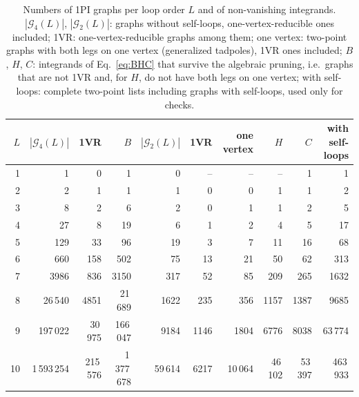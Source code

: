 \begin{table}
\caption{\label{tab:graphcounts}%
Numbers of 1PI graphs per loop order $L$ and of non-vanishing integrands. $|\mathcal G_4(L)|$, $|\mathcal G_2(L)|$:
graphs without self-loops, one-vertex-reducible ones included; 1VR: one-vertex-reducible graphs among them; one vertex:
two-point graphs with both legs on one vertex (generalized tadpoles), 1VR ones included; $B$, $H$, $C$: integrands of
Eq.~\eqref{eq:BHC} that survive the algebraic pruning, i.e.\ graphs that are not 1VR and, for $H$, do not have both
legs on one vertex; with self-loops: complete two-point lists including graphs with self-loops, used only for
checks. }
\begin{ruledtabular}
\begin{tabular}{rrrrrrrrrr}
$L$ & $|\mathcal G_4(L)|$ & 1VR & $B$ & $|\mathcal G_2(L)|$ & 1VR & one vertex & $H$ & $C$ & with self-loops \\
\hline
1 & 1        & 0    & 1                      & 0    & --   & --   & --                    & 1\footnotemark[1]     & 1    \\
2 & 2        & 1    & 1                      & 1    & 0    & 0    & 1                     & 1                     & 2    \\
3 & 8        & 2    & 6                      & 2    & 0    & 1    & 1                     & 2                     & 5    \\
4 & 27       & 8    & 19                     & 6    & 1    & 2    & 4                     & 5                     & 17   \\
5 & 129      & 33   & 96                     & 19   & 3    & 7    & 11                    & 16                    & 68   \\
6 & 660      & 158  & 502                    & 75   & 13   & 21   & 50                    & 62                    & 313  \\
7 & 3986     & 836  & 3150                   & 317  & 52   & 85   & 209                   & 265                   & 1632 \\
8 & 26\,540  & 4851 & 21\,689 & 1622 & 235  & 356  & 1157  & 1387  & 9685 \\
9 & 197\,022 & 30\,975 & 166\,047\footnotemark[2] & 9184 & 1146 & 1804 & 6776  & 8038  & 63\,774 \\
10 & 1\,593\,254 & 215\,576 & 1\,377\,678\footnotemark[2] & 59\,614 & 6217 & 10\,064 & 46\,102\footnotemark[2] & 53\,397\footnotemark[2] & 463\,933 \\
\end{tabular}
\end{ruledtabular}
\end{table}


